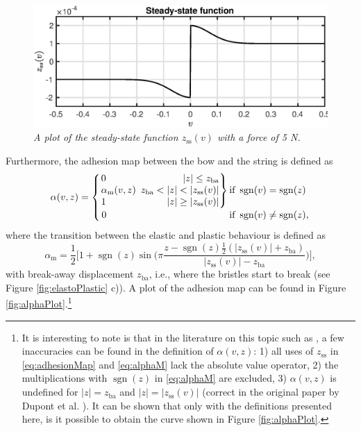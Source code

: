 \documentclass[twoside,a4paper,dvipsnames]{article}
\newenvironment{rcases}
  {\left.\begin{alignedat}{2}}
  {\end{alignedat}\right\rbrace}
\DeclareMathOperator{\sgn}{sgn}
\begin{document}
\begin{figure}[ht]
\centerline{\includegraphics[width=1.0\columnwidth]{steadyState.eps}}
\caption{\label{fig:zss}{\it A plot of the steady-state function $z_\text{ss}(v)$ with a force of 5 N.}}
\end{figure}
Furthermore, the adhesion map between the bow and the string is defined as
\begin{equation}\label{eq:adhesionMap}
\alpha(v, z) = 
\begin{aligned}
    \begin{cases}
    \begin{rcases}
        &0 & |z| \leq z_\text{ba}\\
       &\alpha_\text{m}(v,z)&\ \, z_\text{ba}<|z|<|z_\text{ss}(v)|\\        &1 &|z|\geq|z_\text{ss}(v)|
        \end{rcases} 
        
        &\!\!\!\!\!\text{if}\  \sgn(v)=\sgn(z)\\
        \,0&\!\!\!\!\!\!\,\text{if}\  \sgn(v)\neq\sgn(z),
    \end{cases}
    \end{aligned}
\end{equation}
where the transition between the elastic and plastic behaviour is defined as
\begin{equation}\label{eq:alphaM}
    \alpha_\text{m} = \frac{1}{2}\bigg[1+\sgn(z)\sin\bigg(\pi\frac{z-\sgn(z)\frac{1}{2}(|z_\text{ss}(v)|+z_\text{ba})}{|z_\text{ss}(v)|-z_\text{ba}}\bigg)\bigg],
\end{equation}
with break-away displacement $z_\text{ba}$, i.e., where the bristles start to break (see Figure \ref{fig:elastoPlastic} c)). A plot of the adhesion map can be found in Figure \ref{fig:alphaPlot}.\footnote{It is interesting to note is that in the literature on this topic such as \cite{Dupont2002, Serafin2003, Serafin2004, Avanzini2005}, a few inaccuracies can be found in the definition of $\alpha(v,z)$: 1) all uses of $z_\text{ss}$ in \eqref{eq:adhesionMap} and \eqref{eq:alphaM} lack the absolute value operator, 2) the multiplications with $\sgn(z)$ in \eqref{eq:alphaM} are excluded, 3) $\alpha(v,z)$ is undefined for $|z|=z_\text{ba}$ and $|z|=|z_\text{ss}(v)|$ (correct in the original paper by Dupont et al. \cite{Dupont2002}). It can be shown that only with the definitions presented here, is it possible to obtain the curve shown in Figure \ref{fig:alphaPlot}.}
\end{document}
